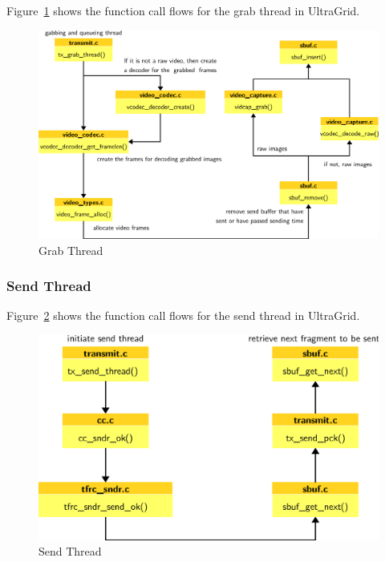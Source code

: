 Figure~\ref{fig:ultra-grab} shows the function call flows for the grab thread in
UltraGrid.

\begin{figure}[!h]
\begin{center}
\includegraphics[scale=.5]{./img/ultra-grab}
\caption{\label{fig:ultra-grab}Grab Thread}
\end{center}
\end{figure}

\subsubsection{\label{sssec:ultra-send}Send Thread} 

Figure~\ref{fig:ultra-send} shows the function call flows for the send thread in
UltraGrid.

\begin{figure}[!h]
\begin{center}
\includegraphics[scale=.5]{./img/ultra-send}
\caption{\label{fig:ultra-send}Send Thread}
\end{center}
\end{figure}

\newpage

